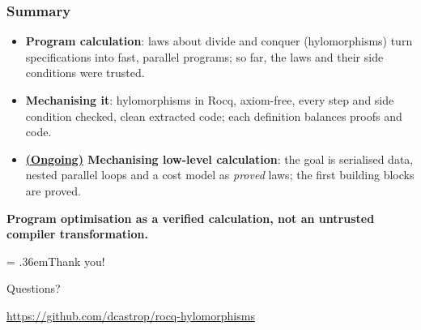 \begin{frame}
  \frametitle{Summary}
  \begin{itemize}
    \item \textbf{Program calculation}: laws about divide and conquer
      (hylomorphisms) turn specifications into fast, parallel programs; so
      far, the laws and their side conditions were trusted.
    \item \textbf{Mechanising it}: hylomorphisms in Rocq, axiom-free, every
      step and side condition checked, clean extracted code; each
      definition balances proofs and code.
    \item \textbf{\underline{(Ongoing)} Mechanising low-level calculation}: the goal
      is serialised data, nested parallel loops and a cost model as
      \emph{proved} laws; the first building blocks are proved.
  \end{itemize}
  \begin{center}
    \textbf{Program optimisation as a verified calculation, not an
    untrusted compiler transformation.}
  \end{center}
\end{frame}

\begin{frame}
  \thispagestyle{talknofooter}
  \vfill
  \begin{center}
    \begin{minipage}{.75\textwidth}
      \begin{sticky}[halign = center]
        {\Huge\spaceskip = .36em\relax Thank you!\par}
        \bigskip
        {\large Questions?\par}
        \medskip
        \url{https://github.com/dcastrop/rocq-hylomorphisms}\par
      \end{sticky}
    \end{minipage}
  \end{center}
  \vfill
\end{frame}
